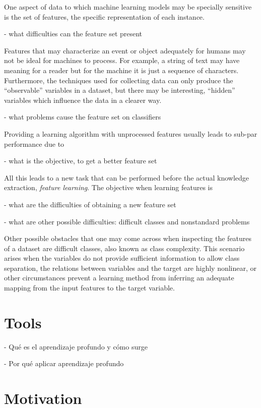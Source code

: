 One aspect of data to which machine learning  models may be specially sensitive is the set of features, the specific representation of each instance.

- what difficulties can the feature set present

Features that may characterize an event or object adequately for humans may not be ideal for machines to process. For example, a string of text may have meaning for a reader but for the machine it is just a sequence of characters. Furthermore, the techniques used for collecting data can only produce the ``observable'' variables in a dataset, but there may be interesting, ``hidden'' variables which influence the data in a clearer way.

- what problems cause the feature set on classifiers

Providing a learning algorithm with unprocessed features usually leads to sub-par performance due to 

- what is the objective, to get a better feature set

All this leads to a new task that can be performed before the actual knowledge extraction, \textit{feature learning}. The objective when learning features is 

- what are the difficulties of obtaining a new feature set

- what are other possible difficulties: difficult classes and nonstandard problems

Other possible obstacles that one may come across when inspecting the features of a dataset are difficult classes, also known as class complexity. This scenario arises when the variables do not provide sufficient information to allow class separation, the relations between variables and the target are highly nonlinear, or other circumstances prevent a learning method from inferring an adequate mapping from the input features to the target variable.

\section{Tools}

- Qué es el aprendizaje profundo y cómo surge

- Por qué aplicar aprendizaje profundo



\section{Motivation}

